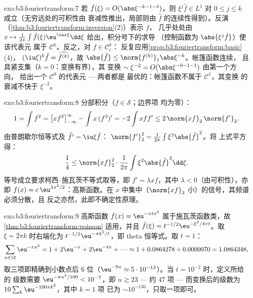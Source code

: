 \begin{solution}{exo:b3:fouriertransform:7}
若 $\hat f(\xi) = O(\abs\xi^{-k-1-\delta})$，则 $\xi^j\hat f
\in L^1$ 对 $0 \leq j \leq k$ 成立（无穷远处的可积性由
衰减性推出，局部则由 $\hat f$ 的连续性得到）。反演
（\cref{thm:b3:fouriertransform:inversion}(2)）表示 $f$，
几乎处处由 $x \mapsto \frac1{2\pi}\int\hat f(\xi)\eu^{\iu
x\xi}\dd\xi$ 给出，积分号下的求导
（控制函数为 $\abs{\xi^j\hat f}$）使该代表元
属于 $\mathcal C^k$。反之，对 $f \in \mathcal C_c^k$：
反复应用\cref{prop:b3:fouriertransform:basic}(4)，
$(\iu\xi)^k\hat f = \widehat{f^{(k)}}$，故 $\abs{\hat f} \leq
\norm{f^{(k)}}_1\abs\xi^{-k}$。帐篷函数连续，
且具紧支集（$k = 0$：变换有界），其
变换 $\sim \xi^{-2} = O(\abs\xi^{-0-1-1})$ 由第一个方向，
给出一个 $\mathcal C^0$ 的代表元 --- 两者都是
最优的：帐篷函数不属于 $\mathcal C^1$，其变换
的衰减不快于 $\xi^{-2}$。
\end{solution}

\begin{solution}{exo:b3:fouriertransform:8}
分部积分（$f \in \mathcal S$；边界项
均为零）：
\[
1 = \int f^2 = \bigl[xf^2\bigr]_{-\infty}^{\infty} - \int
x\,(f^2)' = -2\int xff' \leq 2\,\norm{xf}_2\,\norm{f'}_2 .
\]
由普朗歇尔恒等式及 $\widehat{f'} = \iu\xi\hat f$：
$\norm{f'}_2^2 = \frac1{2\pi}\int\xi^2\abs{\hat f}^2$。将
上式平方得：
\[
\frac14 \leq \norm{xf}_2^2\cdot\frac1{2\pi}
\int\xi^2\abs{\hat f}^2\dd\xi .
\]
等号成立要求柯西–施瓦茨不等式取等，即 $f' =
\lambda xf$，其中 $\lambda < 0$（由可积性），亦即 $f(x) =
c\,\eu^{\lambda x^2/2}$：高斯函数。在
$x$ 中集中（$\norm{xf}_2$ 小）的信号，其频谱必须分散，且
反之亦然，此即不确定性原理。
\end{solution}

\begin{solution}{exo:b3:fouriertransform:9}
高斯函数 $f(x) = \eu^{-\pi tx^2}$ 属于施瓦茨函数类，故
\cref{thm:b3:fouriertransform:poisson} 适用，并且
$\hat f(\xi) = t^{-1/2}\eu^{-\xi^2/4\pi t}$。取 $\xi = 2\pi
k$ 时右端化为 $t^{-1/2}\eu^{-\pi k^2/t}$，即
theta 恒等式。取 $t = 1$：
\[
\sum_{n\in\Z}\eu^{-\pi n^2} = 1 + 2\eu^{-\pi} + 2\eu^{-4\pi} +
\cdots \approx 1 + 0.0864278 + 0.0000070 = 1.0864348,
\]
取三项即精确到小数点后 $6$ 位（$\eu^{-9\pi}
\approx 5\cdot10^{-13}$）。当 $t = 10^{-2}$ 时，定义所给的
级数需要 $\eu^{-\pi n^2/100} < 10^{-7}$，即 $n \gtrsim
23$ --- 约 $47$ 项 --- 而变换后的级数为
$10\sum_k\eu^{-100\pi k^2}$，其中 $k = 1$ 项
已为 $\sim 10^{-136}$，只取一项即可。
\end{solution}

